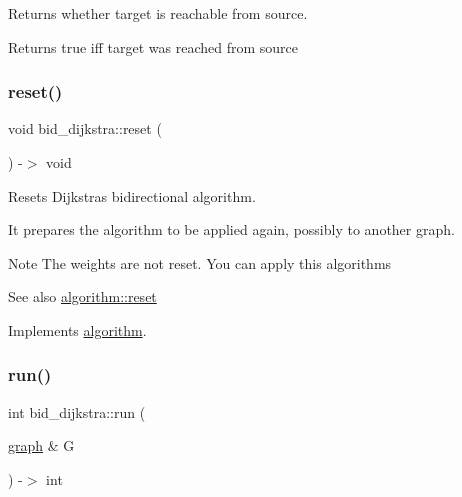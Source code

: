 Returns whether target is reachable from source. 

\begin{DoxyReturn}{Returns}
{\ttfamily true} iff target was reached from source 
\end{DoxyReturn}
\mbox{\label{classbid__dijkstra_ac7fa26bc76c1d3d0e0074fb01c66f72e}} 
\subsubsection{\texorpdfstring{reset()}{reset()}}
{\footnotesize\ttfamily void bid\+\_\+dijkstra\+::reset (\begin{DoxyParamCaption}{ }\end{DoxyParamCaption}) -\/$>$ void\hspace{0.3cm}{\ttfamily [virtual]}}



Resets Dijkstra\textquotesingle{}s bidirectional algorithm. 

It prepares the algorithm to be applied again, possibly to another graph.

\begin{DoxyNote}{Note}
The weights are not reset. You can apply this algorithms
\end{DoxyNote}
\begin{DoxySeeAlso}{See also}
\mbox{\hyperlink{classalgorithm_aea645f2e39976a477c8f8564656fd1b6}{algorithm\+::reset}} 
\end{DoxySeeAlso}


Implements \mbox{\hyperlink{classalgorithm_aea645f2e39976a477c8f8564656fd1b6}{algorithm}}.

\mbox{\label{classbid__dijkstra_a819e72158a0c594ec5d8bcf07b6a435a}} 
\subsubsection{\texorpdfstring{run()}{run()}}
{\footnotesize\ttfamily int bid\+\_\+dijkstra\+::run (\begin{DoxyParamCaption}\item[{\mbox{\hyperlink{classgraph}{graph}} \&}]{G }\end{DoxyParamCaption}) -\/$>$ int\hspace{0.3cm}{\ttfamily [virtual]}}



